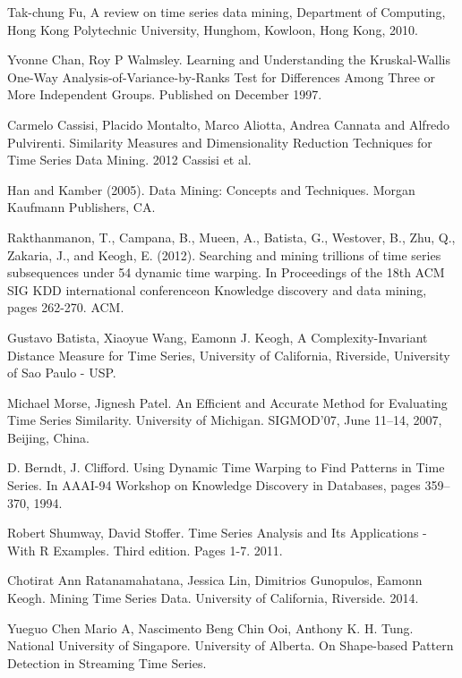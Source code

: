 \begin{thebibliography}{9}
Tak-chung Fu, A review on time series data mining, Department of Computing, Hong Kong Polytechnic University, Hunghom, Kowloon, Hong Kong, 2010.

Yvonne Chan, Roy P Walmsley. Learning and Understanding the Kruskal-Wallis One-Way Analysis-of-Variance-by-Ranks Test for Differences Among Three or More Independent Groups. Published on December 1997.

Carmelo Cassisi, Placido Montalto, Marco Aliotta, Andrea Cannata and Alfredo Pulvirenti. Similarity Measures
and Dimensionality Reduction Techniques for Time Series Data Mining. 2012 Cassisi et al.

Han and Kamber (2005). Data Mining: Concepts and Techniques. Morgan Kaufmann
Publishers, CA.

Rakthanmanon, T., Campana, B., Mueen, A., Batista, G., Westover, B., Zhu, Q., Zakaria, J., and Keogh, E. (2012). Searching and mining trillions of time series subsequences under 54 dynamic time warping. In Proceedings of the 18th ACM SIG KDD international conferenceon Knowledge discovery and data mining, pages 262-270. ACM.

Gustavo Batista, Xiaoyue Wang, Eamonn J. Keogh, A Complexity-Invariant Distance Measure for Time Series, University of California, Riverside, University of Sao Paulo - USP.

Michael Morse, Jignesh Patel. An Efficient and Accurate Method for Evaluating Time Series Similarity. University of Michigan. SIGMOD’07, June 11–14, 2007, Beijing, China.

D. Berndt, J. Clifford. Using Dynamic Time Warping to Find Patterns in Time Series. In AAAI-94 Workshop on Knowledge Discovery in Databases, pages 359–370, 1994.

Robert Shumway, David Stoffer. Time Series Analysis and Its Applications - With R Examples. Third edition. Pages 1-7. 2011.

Chotirat Ann Ratanamahatana, Jessica Lin, Dimitrios Gunopulos, Eamonn Keogh. Mining Time Series Data. University of California, Riverside. 2014.

Yueguo Chen Mario A, Nascimento Beng Chin Ooi, Anthony K. H. Tung. National University of Singapore. University of Alberta. On Shape-based Pattern Detection in Streaming Time Series.
\end{thebibliography}